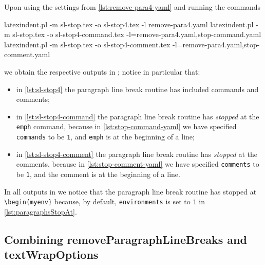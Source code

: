 	Upon using the settings from \vref{lst:remove-para4-yaml} and running the commands
	\begin{widepage}
		\begin{commandshell}
latexindent.pl -m sl-stop.tex -o sl-stop4.tex -l remove-para4.yaml
latexindent.pl -m sl-stop.tex -o sl-stop4-command.tex -l=remove-para4.yaml,stop-command.yaml
latexindent.pl -m sl-stop.tex -o sl-stop4-comment.tex -l=remove-para4.yaml,stop-comment.yaml
    \end{commandshell}
	\end{widepage}
	we obtain the respective outputs in ; notice in particular
	that:
	\begin{itemize}
		\item in \cref{lst:sl-stop4} the paragraph line break routine has included commands and
		      comments;
		\item in \cref{lst:sl-stop4-command} the paragraph line break routine has
		      \emph{stopped} at the \texttt{emph} command, because in
		      \cref{lst:stop-command-yaml} we have specified \texttt{commands} to be
		      \texttt{1}, and \texttt{emph} is at the beginning of a
		      line;
		\item in \cref{lst:sl-stop4-comment} the paragraph line break routine has
		      \emph{stopped} at the comments, because in \cref{lst:stop-comment-yaml} we
		      have specified \texttt{comments} to be \texttt{1}, and the
		      comment is at the beginning of a line.
	\end{itemize}
	In all outputs in  we notice that the paragraph line break
	routine has stopped at \lstinline!\begin{myenv}! because, by default,
	\texttt{environments} is set to \texttt{1} in
	\vref{lst:paragraphsStopAt}.


\subsection{Combining removeParagraphLineBreaks and textWrapOptions}\label{subsec:removeparagraphlinebreaks:and:textwrap}

